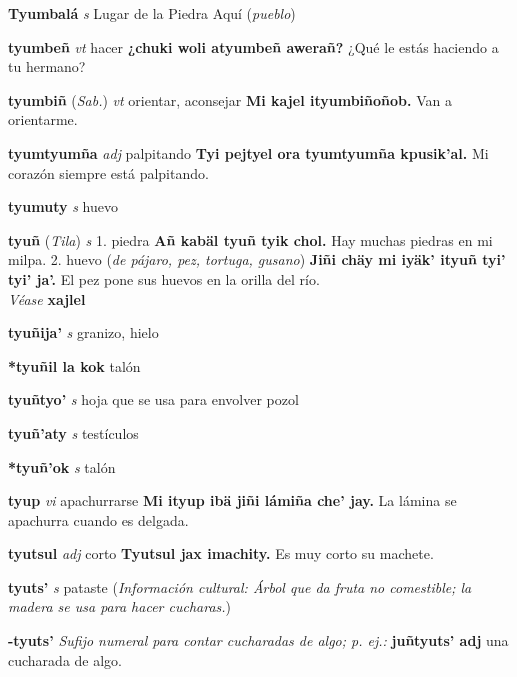 \documentclass[10pt]{scrbook}
\newcommand{\entry}[1]{\textbf{#1}}
\newcommand{\onedefinition}[1]{#1.}
\newcommand{\nontranslationdef}[1]{\textit{#1}}
\newcommand{\partofspeech}[1]{\textit{#1}}
\newcommand{\spanishtranslation}[1]{#1}
\newcommand{\clarification}[1]{(\textit{#1})}
\newcommand{\cholexample}[1]{\textbf{#1}}
\newcommand{\exampletranslation}[1]{#1}
\newcommand{\alsosee}[1]{\\\textit{Véase} \textbf{#1}}
\newcommand{\relevantdialect}[1]{(\textit{#1})}
\newcommand{\culturalinformation}[1]{(\textit{#1})}
\begin{document}
\begin{multicols}{2}
\entry{Tyumbalá}
\partofspeech{s}
\spanishtranslation{Lugar de la Piedra Aquí}
\clarification{pueblo}

\entry{tyumbeñ}
\partofspeech{vt}
\spanishtranslation{hacer}
\cholexample{¿chuki woli atyumbeñ awerañ?}
\exampletranslation{¿Qué le estás haciendo a tu hermano?}

\entry{tyumbiñ}
\relevantdialect{Sab.}
\partofspeech{vt}
\spanishtranslation{orientar, aconsejar}
\cholexample{Mi kajel ityumbiñoñob.}
\exampletranslation{Van a orientarme.}

\entry{tyumtyumña}
\partofspeech{adj}
\spanishtranslation{palpitando}
\cholexample{Tyi pejtyel ora tyumtyumña kpusik'al.}
\exampletranslation{Mi corazón siempre está palpitando.}

\entry{tyumuty}
\partofspeech{s}
\spanishtranslation{huevo}

\entry{tyuñ}
\relevantdialect{Tila}
\partofspeech{s}
\onedefinition{1}
\spanishtranslation{piedra}
\cholexample{Añ kabäl tyuñ tyik chol.}
\exampletranslation{Hay muchas piedras en mi milpa.}
\onedefinition{2}
\spanishtranslation{huevo}
\clarification{de pájaro, pez, tortuga, gusano}
\cholexample{Jiñi chäy mi iyäk' ityuñ tyi' tyi' ja'.}
\exampletranslation{El pez pone sus huevos en la orilla del río.}
\alsosee{xajlel}

\entry{tyuñija'}
\partofspeech{s}
\spanishtranslation{granizo, hielo}

\entry{*tyuñil la kok}
\spanishtranslation{talón}

\entry{tyuñtyo'}
\partofspeech{s}
\spanishtranslation{hoja que se usa para envolver pozol}

\entry{tyuñ'aty}
\partofspeech{s}
\spanishtranslation{testículos}

\entry{*tyuñ'ok}
\partofspeech{s}
\spanishtranslation{talón}

\entry{tyup}
\partofspeech{vi}
\spanishtranslation{apachurrarse}
\cholexample{Mi ityup ibä jiñi lámiña che' jay.}
\exampletranslation{La lámina se apachurra cuando es delgada.}

\entry{tyutsul}
\partofspeech{adj}
\spanishtranslation{corto}
\cholexample{Tyutsul jax imachity.}
\exampletranslation{Es muy corto su machete.}

\entry{tyuts'}
\partofspeech{s}
\spanishtranslation{pataste}
\culturalinformation{Información cultural: Árbol que da fruta no comestible; la madera se usa para hacer cucharas.}

\entry{-tyuts'}
\nontranslationdef{Sufijo numeral para contar cucharadas de algo; p. ej.:}
\cholexample{juñtyuts' adj}
\exampletranslation{una cucharada de algo.}


\end{multicols}
\end{document}
